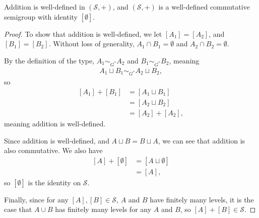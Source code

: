 \documentclass[10pt]{mypackage2}
\begin{document}
\begin{fact}
  Addition is well-defined in $\left(\mathcal{S},+\right)$, and $\left(\mathcal{S},+\right)$ is a well-defined commutative semigroup with identity $\left[\emptyset\right]$.\label{fact:type_semigroup_well_defined}
\end{fact}
\begin{proof}
  To show that addition is well-defined, we let $\left[A_1\right] = \left[A_2\right]$, and $\left[B_1\right] = \left[B_2\right]$. Without loss of generality, $A_1\cap B_1 = \emptyset$ and $A_2\cap B_2 = \emptyset$.\newline

  By the definition of the type, $A_1\sim_{G^{\ast}}A_2$ and $B_1\sim_{G^{\ast}}B_2$, meaning
  \begin{align*}
    A_1\sqcup B_1\sim_{G^{\ast}} A_2\sqcup B_2,
  \end{align*}
  so
  \begin{align*}
    \left[A_1\right] + \left[B_1\right] &= \left[A_1\sqcup B_1\right]\\
                                        &= \left[A_2\sqcup B_2\right]\\
                                        &= \left[A_2\right] + \left[A_2\right],
  \end{align*}
  meaning addition is well-defined.\newline

  Since addition is well-defined, and $A\sqcup B = B\sqcup A$, we can see that addition is also commutative. We also have
  \begin{align*}
    \left[A\right] + \left[\emptyset\right] &= \left[A\sqcup \emptyset\right]\\
                                            &= \left[A\right],
  \end{align*}
  so $\left[\emptyset\right]$ is the identity on $\mathcal{S}$.\newline

  Finally, since for any $\left[A\right],\left[B\right]\in \mathcal{S}$, $A$ and $B$ have finitely many levels, it is the case that $A\cup B$ has finitely many levels for any $A$ and $B$, so $\left[A\right] + \left[B\right] \in \mathcal{S}$. 
\end{proof}
\end{document}
